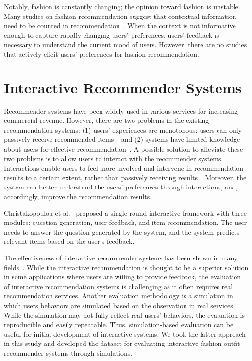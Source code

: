 Notably, fashion is constantly changing; the opinion toward fashion is unstable. Many studies on fashion recommendation suggest that contextual information need to be counted in recommendation~\cite{shen2007gonna, tamhane2017modeling}.
When the context is not informative enough to capture rapidly changing users' preferences, 
users' feedback is necessary to understand the current mood of users.
However, there are no studies that actively elicit users' preferences for fashion recommendation. 


\section{Interactive Recommender Systems}

Recommender systems have been widely used in various services for increasing commercial revenue.
However, there are two problems in the existing recommendation systems:
(1) users' experiences are monotonous: users can only passively receive recommended items~\cite{sinha2002role, herlocker2000explaining}, and
(2) systems have limited knowledge about users for effective recommendation~\cite{jugovac2017interacting}.
A possible solution to alleviate these two problems is 
to allow users to interact with the recommender systems.
Interactions enable users to feel more involved and intervene in recommendation results to a certain extent, rather than passively receiving results~\cite{zhu2019query}.
Moreover, the system can better understand the users' preferences through interactions, and, accordingly, improve the recommendation results.

Christakopoulou et al.~\cite{christakopoulou2018q} proposed a single-round interactive framework with three modules: question generation, user feedback, and item recommendation.
The user needs to answer the question generated by the system, 
and the system predicts relevant items based on the user's feedback.

The effectiveness of interactive recommender systems has been shown in many fields~\cite{adomavicius2011context, chen2012cofeel, bogdanov2013semantic, bakalov2013approach}.
While the interactive recommendation is thought to be a superior solution in some applications
where users are willing to provide feedback,
the evaluation of interactive recommendation systems is challenging 
as it often requires real recommendation services.
Another evaluation methodology is a simulation 
in which users behaviors are simulated based on the observation in real services.
While the simulation may not fully reflect real users' behaviors,
the evaluation is reproducible and easily repeatable. 
Thus, simulation-based evaluation can be useful for initial development of interactive systems.
We took the latter approach in this study and developed 
the dataset for evaluating interactive fashion outfit recommender systems through simulations.